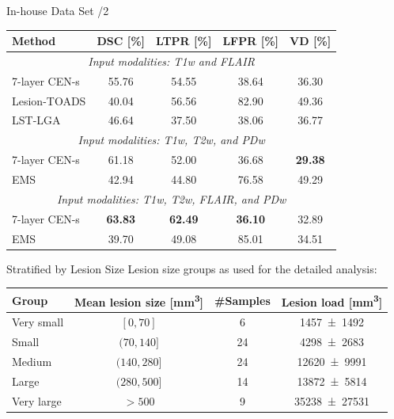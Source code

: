 \documentclass{beamer}
\begin{document}
\begin{frame}{In-house Data Set /2}
\begin{center}
\begin{tabular}{@{}lcccc@{}}
\toprule
Method & DSC [\%] & LTPR [\%] & LFPR [\%] & VD [\%] \\
\midrule
\multicolumn{5}{c}{\textit{Input modalities: T1w and FLAIR}} \\
\midrule
7-layer CEN-s & 55.76 & 54.55 & 38.64 & 36.30 \\[0.2em]
Lesion-TOADS & 40.04 & 56.56 & 82.90 & 49.36 \\ 
LST-LGA & 46.64 & 37.50 & 38.06 & 36.77 \\
\midrule
\multicolumn{5}{c}{\textit{Input modalities: T1w, T2w, and PDw}} \\
\midrule
7-layer CEN-s & 61.18 & 52.00 & 36.68 & \bfseries 29.38 \\
EMS & 42.94 & 44.80 & 76.58 & 49.29 \\
\midrule
\multicolumn{5}{c}{\textit{Input modalities: T1w, T2w, FLAIR, and PDw}} \\
\midrule
7-layer CEN-s & \bfseries 63.83 & \bfseries 62.49 & \bfseries 36.10 & 32.89 \\
EMS & 39.70 & 49.08 & 85.01 & 34.51 \\
\bottomrule
\end{tabular}
\end{center}
\end{frame}

\begin{frame}{Stratified by Lesion Size}
Lesion size groups as used for the detailed analysis:

\begin{center}
\small
\begin{tabular}{@{}lccc@{}}
\toprule
Group & Mean lesion size [\si{\cubic\milli\metre}] & \#Samples & Lesion
load [\si{\cubic\milli\metre}] \\
\midrule
Very small & $[0,70]$ & 6 & \num{1457+-1492} \\
Small      & $(70,140]$ & 24 & \num{4298+-2683} \\
Medium & $(140,280]$ & 24 & \num{12620+-9991} \\
Large & $(280,500]$ & 14 & \num{13872+-5814} \\
Very large & $> 500$ & 9 & \num{35238+-27531} \\
\bottomrule
\end{tabular}
\end{center}
\end{frame}
\end{document}
